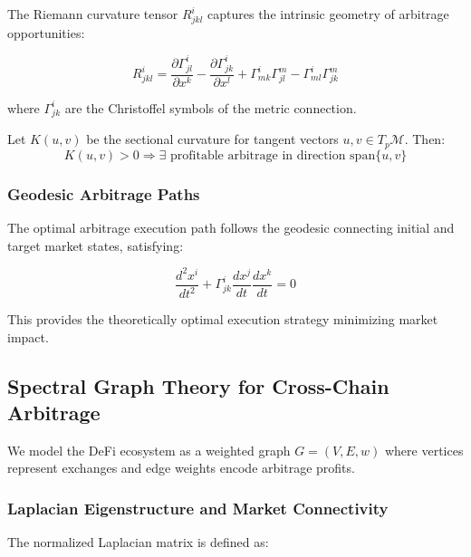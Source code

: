 \documentclass[12pt]{article}
\begin{document}
The Riemann curvature tensor $R^i_{jkl}$ captures the intrinsic geometry of arbitrage opportunities:

\begin{equation}
R^i_{jkl} = \frac{\partial \Gamma^i_{jl}}{\partial x^k} - \frac{\partial \Gamma^i_{jk}}{\partial x^l} + \Gamma^i_{mk}\Gamma^m_{jl} - \Gamma^i_{ml}\Gamma^m_{jk}
\end{equation}

where $\Gamma^i_{jk}$ are the Christoffel symbols of the metric connection.

\begin{theorem}
Let $K(u,v)$ be the sectional curvature for tangent vectors $u,v \in T_p\mathcal{M}$. Then:
\begin{equation}
K(u,v) > 0 \Rightarrow \exists \text{ profitable arbitrage in direction } \text{span}\{u,v\}
\end{equation}
\end{theorem}

\subsubsection{Geodesic Arbitrage Paths}

The optimal arbitrage execution path follows the geodesic connecting initial and target market states, satisfying:

\begin{equation}
\frac{d^2 x^i}{dt^2} + \Gamma^i_{jk} \frac{dx^j}{dt} \frac{dx^k}{dt} = 0
\end{equation}

This provides the theoretically optimal execution strategy minimizing market impact.

\subsection{Spectral Graph Theory for Cross-Chain Arbitrage}

We model the DeFi ecosystem as a weighted graph $G = (V, E, w)$ where vertices represent exchanges and edge weights encode arbitrage profits.

\subsubsection{Laplacian Eigenstructure and Market Connectivity}

The normalized Laplacian matrix is defined as:
\end{document}
